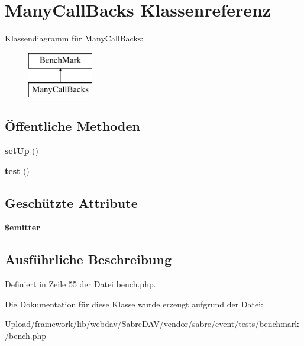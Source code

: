 \hypertarget{class_many_call_backs}{}\section{Many\+Call\+Backs Klassenreferenz}
\label{class_many_call_backs}
Klassendiagramm für Many\+Call\+Backs\+:\begin{figure}[H]
\begin{center}
\leavevmode
\includegraphics[height=2.000000cm]{class_many_call_backs}
\end{center}
\end{figure}
\subsection*{Öffentliche Methoden}
\begin{DoxyCompactItemize}
\item 
\mbox{\label{class_many_call_backs_a37ccc86182f8d0f6dfe9de1a9a4ced15}} 
{\bfseries set\+Up} ()
\item 
\mbox{\label{class_many_call_backs_abe9634bd731d6d08a4ea387ff37b84bf}} 
{\bfseries test} ()
\end{DoxyCompactItemize}
\subsection*{Geschützte Attribute}
\begin{DoxyCompactItemize}
\item 
\mbox{\label{class_many_call_backs_a844a281c739edf5648b528b74bbe542b}} 
{\bfseries \$emitter}
\end{DoxyCompactItemize}


\subsection{Ausführliche Beschreibung}


Definiert in Zeile 55 der Datei bench.\+php.



Die Dokumentation für diese Klasse wurde erzeugt aufgrund der Datei\+:\begin{DoxyCompactItemize}
\item 
Upload/framework/lib/webdav/\+Sabre\+D\+A\+V/vendor/sabre/event/tests/benchmark/bench.\+php\end{DoxyCompactItemize}
